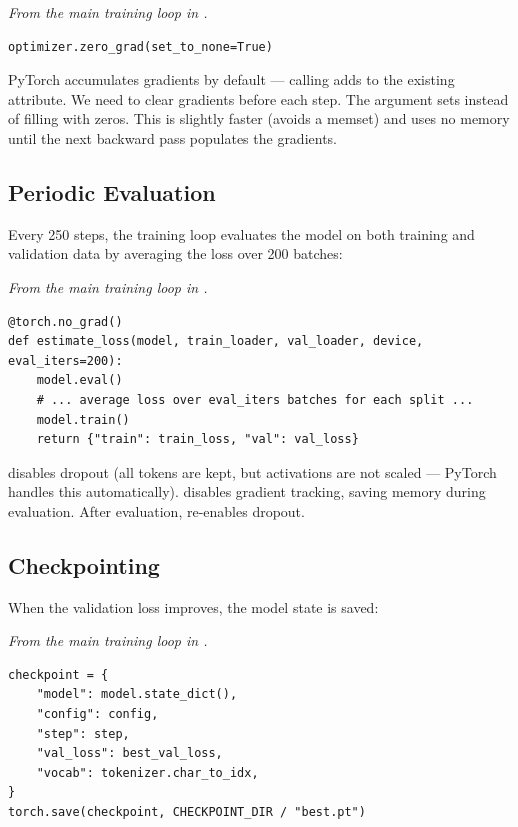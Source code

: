 \concepttag
{\small\itshape From the main training loop in .}
\begin{lstlisting}
optimizer.zero_grad(set_to_none=True)
\end{lstlisting}

PyTorch accumulates gradients by default --- calling  adds to the existing  attribute. We need to clear gradients before each step. The  argument sets  instead of filling with zeros. This is slightly faster (avoids a memset) and uses no memory until the next backward pass populates the gradients.

\subsection{Periodic Evaluation}

Every 250 steps, the training loop evaluates the model on both training and validation data by averaging the loss over 200 batches:

\concepttag
{\small\itshape From the main training loop in .}
\begin{lstlisting}
@torch.no_grad()
def estimate_loss(model, train_loader, val_loader, device, eval_iters=200):
    model.eval()
    # ... average loss over eval_iters batches for each split ...
    model.train()
    return {"train": train_loss, "val": val_loss}
\end{lstlisting}

 disables dropout (all tokens are kept, but activations are not scaled --- PyTorch handles this automatically).  disables gradient tracking, saving memory during evaluation. After evaluation,  re-enables dropout.

\subsection{Checkpointing}

When the validation loss improves, the model state is saved:

\concepttag
{\small\itshape From the main training loop in .}
\begin{lstlisting}
checkpoint = {
    "model": model.state_dict(),
    "config": config,
    "step": step,
    "val_loss": best_val_loss,
    "vocab": tokenizer.char_to_idx,
}
torch.save(checkpoint, CHECKPOINT_DIR / "best.pt")
\end{lstlisting}

